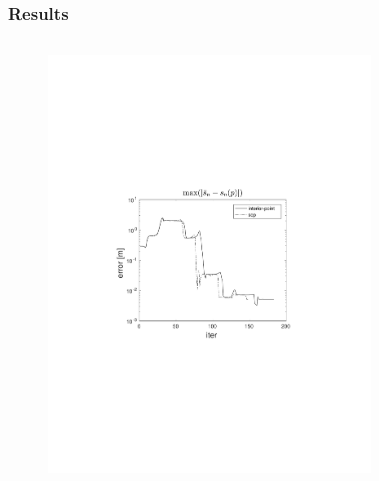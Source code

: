 \documentclass{beamer}
\begin{document}
\begin{frame}
    \frametitle{Results}

    \begin{columns}[t]
            \begin{figure}
                \centering
                \includegraphics[trim=4cm 9cm 4cm 8.5cm, clip=true, width=\linewidth]{img/convPlotS_1}
            \end{figure}
            \begin{figure}
                \centering

\end{figure}
\end{columns}
\end{frame}
\end{document}

